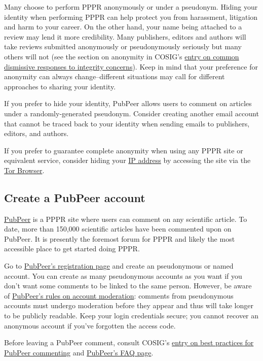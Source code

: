 \documentclass[letterpaper, 12pt]{article}
\begin{document}
Many choose to perform PPPR anonymously or under a pseudonym. Hiding your identity when performing PPPR can help protect you from harassment, litigation and harm to your career. On the other hand, your name being attached to a review may lend it more credibility. Many publishers, editors and authors will take reviews submitted anonymously or pseudonymously seriously but many others will not (see the section on anonymity in COSIG's \href{https://osf.io/7w5ys}{entry on common dismissive responses to integrity concerns}). Keep in mind that your preference for anonymity can always change--different situations may call for different approaches to sharing your identity.

If you prefer to hide your identity, PubPeer allows users to comment on articles under a randomly-generated pseudonym. Consider creating another email account that cannot be traced back to your identity when sending emails to publishers, editors, and authors. 

If you prefer to guarantee complete anonymity when using any PPPR site or equivalent service, consider hiding your \href{https://en.wikipedia.org/wiki/IP_address}{IP address} by accessing the site via the \href{https://www.torproject.org/}{Tor Browser}.

\subsection*{Create a PubPeer account}

\href{https://pubpeer.com/}{PubPeer} is a PPPR site where users can comment on any scientific article. To date, more than 150,000 scientific articles have been commented upon on PubPeer. It is presently the foremost forum for PPPR and likely the most accessible place to get started doing PPPR.

Go to \href{https://pubpeer.com/register}{PubPeer's registration page} and create an pseudonymous or named account.
You can create as many pseudonymous accounts as you want if you don't want some comments to be linked to the same person.
However, be aware of \href{https://pubpeer.com/static/faq#24}{PubPeer's rules on account moderation}: comments from pseudonymous accounts must undergo moderation before they appear and thus will take longer to be publicly readable. Keep your login credentials secure; you cannot recover an anonymous account if you've forgotten the access code.

Before leaving a PubPeer comment, consult COSIG's \href{https://osf.io/sghaq}{entry on best practices for PubPeer commenting} and \href{https://pubpeer.com/static/faq}{PubPeer's FAQ page}.
\end{document}
